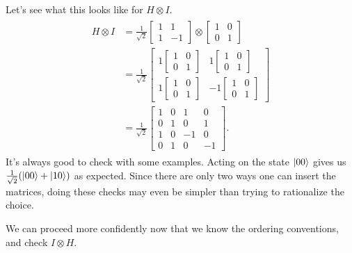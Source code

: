 \documentclass{book}
\begin{document}
    Let's see what this looks like for $H \otimes I$.
    \begin{align}
    \begin{aligned}
        H \otimes I &= \frac{1}{\sqrt{2}} \begin{bmatrix}
            1 & 1 \\
            1 & -1
        \end{bmatrix} \otimes \begin{bmatrix}
            1 & 0 \\
            0 & 1
        \end{bmatrix} \\
        &= \frac{1}{\sqrt{2}} \begin{bmatrix}
            1 \begin{bmatrix}
                1 & 0 \\
                0 & 1
            \end{bmatrix} & 1 \begin{bmatrix}
                1 & 0 \\ 
                0 & 1
            \end{bmatrix} \\[4ex]
            1 \begin{bmatrix}
                1 & 0 \\
                0 & 1
            \end{bmatrix} & -1 \begin{bmatrix}
                1 & 0 \\
                0 & 1
            \end{bmatrix}
        \end{bmatrix} \\
        &= \frac{1}{\sqrt{2}} \begin{bmatrix}
            1 & 0 & 1 & 0 \\
            0 & 1 & 0 & 1 \\
            1 & 0 & -1 & 0 \\
            0 & 1 & 0 & -1
        \end{bmatrix}.
    \end{aligned}
    \end{align}
    It's always good to check with some examples. Acting on the state $\ket{00}$ gives us $\frac{1}{\sqrt{2}}(\ket{00} + \ket{10})$ as expected. Since there are only two ways one can insert the matrices, doing these checks may even be simpler than trying to rationalize the choice. 

    We can proceed more confidently now that we know the ordering conventions, and check $I \otimes H$.
\end{document}
